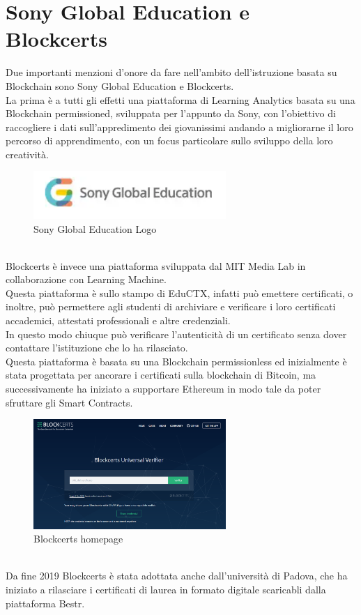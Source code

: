 \section{Sony Global Education e Blockcerts}
Due importanti menzioni d'onore da fare nell'ambito dell'istruzione basata su Blockchain sono Sony Global Education e Blockcerts.
\\La prima è a tutti gli effetti una piattaforma di Learning Analytics basata su una Blockchain permissioned, sviluppata per l'appunto da Sony, con l'obiettivo di raccogliere i dati 
sull'appredimento dei giovanissimi andando a migliorarne il loro percorso di apprendimento, con un focus particolare sullo sviluppo della loro creatività.
\begin{figure}[h]
    \centering
    \includegraphics[width=0.65\textwidth]{Immagini/Sony_Global_Education_logo.PNG}
    \caption{Sony Global Education Logo}
\end{figure}
\\Blockcerts è invece una piattaforma sviluppata dal MIT Media Lab in collaborazione con Learning Machine. 
\\Questa piattaforma è sullo stampo di EduCTX,
infatti può emettere certificati, o inoltre, può permettere agli studenti di archiviare e verificare i loro certificati accademici, attestati professionali e altre credenziali.
\\In questo modo chiuque può verificare l'autenticità di un certificato senza dover contattare l'istituzione che lo ha rilasciato.
\\Questa piattaforma è basata su una Blockchain permissionless ed inizialmente è stata progettata per ancorare i certificati sulla blockchain di Bitcoin, 
ma successivamente ha iniziato a supportare Ethereum in modo tale da poter sfruttare gli Smart Contracts.
\begin{figure}[h]
    \centering
    \includegraphics[width=0.65\textwidth]{Immagini/Blockcerts_homepage.PNG}
    \caption{Blockcerts homepage}
\end{figure}
\\Da fine 2019 Blockcerts è stata adottata anche dall'università di Padova, che ha iniziato a rilasciare i certificati di laurea in formato digitale scaricabli dalla piattaforma Bestr.
